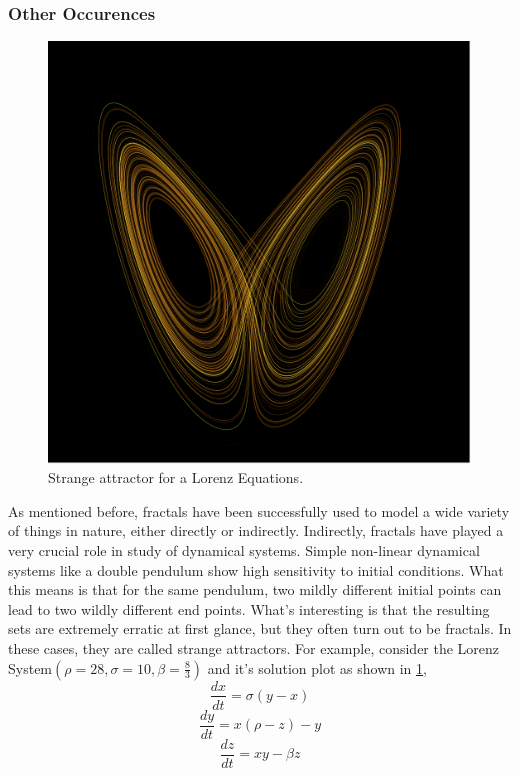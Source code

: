 \subsubsection{Other Occurences}
\begin{figure}[h!]
  \includegraphics[width=\linewidth]{Pictures/strange_attractor.png}
  \caption{Strange attractor for a Lorenz Equations.}
  \label{fig:strange_attractor}
\end{figure}
As mentioned before, fractals have been successfully used to model a wide
variety of things in nature, either directly or indirectly. Indirectly, fractals
have played a very crucial role in study of dynamical systems. Simple non-linear
dynamical systems like a double pendulum show high sensitivity to initial
conditions. What this means is that for the same pendulum, two mildly different
initial points can lead to two wildly different end points. What's interesting
is that the resulting sets are extremely erratic at first glance, but they often
turn out to be fractals. In these cases, they are called strange attractors.
For example, consider the Lorenz System$(\rho = 28, \sigma =10,
\beta=\frac{8}{3})$ and it's solution plot as shown in
\ref{fig:strange_attractor},
\[
    \frac{dx}{dt} = \sigma(y - x)
\]
\[
    \frac{dy}{dt} = x(\rho -z) - y
\]
\[
    \frac{dz}{dt} = xy - \beta z
\]

